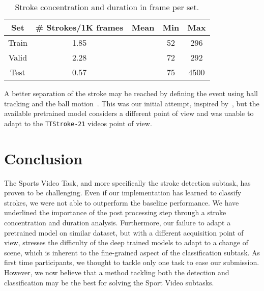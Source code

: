 \documentclass[sigconf]{acmart-me}
\begin{document}
\begin{table}
    \caption{Stroke concentration and duration in frame per set.}
    \begin{tabular}{|c|cccc|}
    \hline
    Set  & \# Strokes/1K frames & Mean  & Min  & Max \\
    \hline
    Train & 1.85    &    & 52 & 296   \\
    Valid & 2.28    &    & 72 & 292   \\
    Test  & 0.57    &    & 75 & 4500  \\ 
    \hline
    \end{tabular}
    \label{tab:hist}
\end{table}



\par 

A better separation of the stroke may be reached by defining the event using ball tracking and the ball motion~\cite{calandre2021table}. This was our initial attempt, inspired by~\cite{voeikov2020ttnet}, but the available pretrained model considers a different point of view and was unable to adapt to the \texttt{TTStroke-21} videos point of view.




\section{Conclusion}
\label{sec:conclusion}

The Sports Video Task, and more specifically the stroke detection subtask, has proven to be challenging. Even if our implementation has learned to classify strokes, we were not able to outperform the baseline performance. We have underlined the importance of the post processing step through a stroke concentration and duration analysis. Furthermore, our failure to adapt a pretrained model on similar dataset, but with a different acquisition point of view, stresses the difficulty of the deep trained models to adapt to a change of scene, which is inherent to the fine-grained aspect of the classification subtask. As first time participants, we thought to tackle only one task to ease our submission. However, we now believe that a method tackling both the detection and classification may be the best for solving the Sport Video subtasks.



\def\bibfont{\small}  
\end{document}

